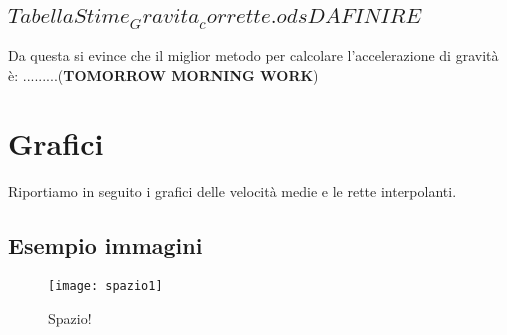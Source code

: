 \documentclass[12pt]{article} %
\begin{document}
	\subsection {$Tabella Stime_Gravita_corrette.ods DA FINIRE$}
Da questa si evince che il miglior metodo per calcolare l'accelerazione di gravità è: .........(\textbf{TOMORROW MORNING WORK})



\section {Grafici}
	Riportiamo in seguito i grafici delle velocità medie e le rette interpolanti.
	
\subsection{Esempio immagini}
\begin{figure}[H]
    \centering
    \texttt{[image: spazio1]}
    \caption{Spazio!}
    \label{fig:spazio1}
\end{figure}
\end{document}
